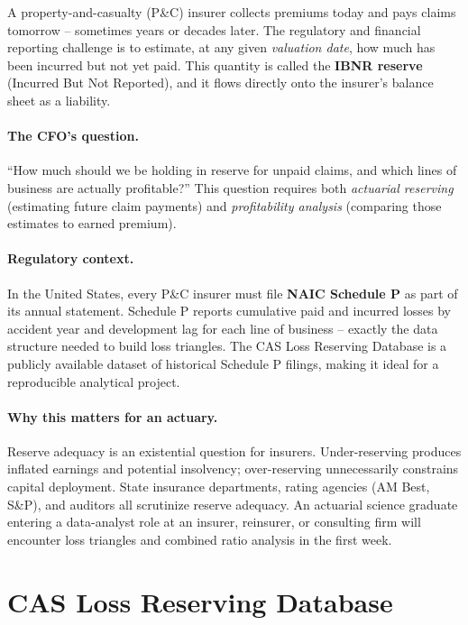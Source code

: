 A property-and-casualty (P\&C) insurer collects premiums today and pays
claims tomorrow -- sometimes years or decades later.  The regulatory and
financial reporting challenge is to estimate, at any given \emph{valuation
date}, how much has been incurred but not yet paid.  This quantity is called
the \textbf{IBNR reserve} (Incurred But Not Reported), and it flows directly
onto the insurer's balance sheet as a liability.

\paragraph{The CFO's question.}
``How much should we be holding in reserve for unpaid claims, and which lines
of business are actually profitable?''  This question requires both
\emph{actuarial reserving} (estimating future claim payments) and
\emph{profitability analysis} (comparing those estimates to earned premium).

\paragraph{Regulatory context.}
In the United States, every P\&C insurer must file \textbf{NAIC Schedule P}
as part of its annual statement.  Schedule P reports cumulative paid and
incurred losses by accident year and development lag for each line of
business -- exactly the data structure needed to build loss triangles.  The
CAS Loss Reserving Database is a publicly available dataset of historical
Schedule P filings, making it ideal for a reproducible analytical project.

\paragraph{Why this matters for an actuary.}
Reserve adequacy is an existential question for insurers.  Under-reserving
produces inflated earnings and potential insolvency; over-reserving
unnecessarily constrains capital deployment.  State insurance departments,
rating agencies (AM Best, S\&P), and auditors all scrutinize reserve
adequacy.  An actuarial science graduate entering a data-analyst role at an
insurer, reinsurer, or consulting firm will encounter loss triangles and
combined ratio analysis in the first week.

\section{CAS Loss Reserving Database}
\label{sec:ins-cas-data}

